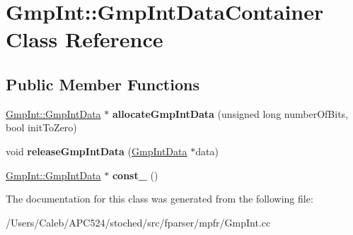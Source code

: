 \hypertarget{class_gmp_int_1_1_gmp_int_data_container}{}\section{Gmp\+Int\+:\+:Gmp\+Int\+Data\+Container Class Reference}
\label{class_gmp_int_1_1_gmp_int_data_container}
\subsection*{Public Member Functions}
\begin{DoxyCompactItemize}
\item 
\mbox{\label{class_gmp_int_1_1_gmp_int_data_container_a8624db5a8c851b93a7a17db3390ca2c1}} 
\hyperlink{struct_gmp_int_1_1_gmp_int_data}{Gmp\+Int\+::\+Gmp\+Int\+Data} $\ast$ {\bfseries allocate\+Gmp\+Int\+Data} (unsigned long number\+Of\+Bits, bool init\+To\+Zero)
\item 
\mbox{\label{class_gmp_int_1_1_gmp_int_data_container_ad94f408d14309dd38ebd727f7de6dfb7}} 
void {\bfseries release\+Gmp\+Int\+Data} (\hyperlink{struct_gmp_int_1_1_gmp_int_data}{Gmp\+Int\+Data} $\ast$data)
\item 
\mbox{\label{class_gmp_int_1_1_gmp_int_data_container_a29996fd561aeb8d44daa95508873341f}} 
\hyperlink{struct_gmp_int_1_1_gmp_int_data}{Gmp\+Int\+::\+Gmp\+Int\+Data} $\ast$ {\bfseries const\+\_} ()
\end{DoxyCompactItemize}


The documentation for this class was generated from the following file\+:\begin{DoxyCompactItemize}
\item 
/\+Users/\+Caleb/\+A\+P\+C524/stoched/src/fparser/mpfr/Gmp\+Int.\+cc\end{DoxyCompactItemize}
